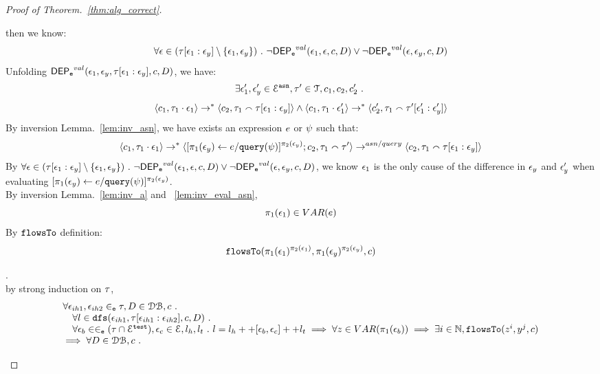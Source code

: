 \documentclass[a4paper,11pt]{article}
\begin{document}
\begin{proof}[Proof of Theorem.~\ref{thm:alg_correct}]
\begin{case}
\begin{subcase}
\begin{subsubcase}
then we know:
\[
  \forall \mathtt{\epsilon} \in (\mathtt{\tau}[\mathtt{\epsilon}_1:\mathtt{\epsilon}_y]\setminus \{\mathtt{\epsilon}_1, \mathtt{\epsilon}_y\}) ~.~
  \neg \mathsf{DEP_{\mathtt{e}}}^{val} (\mathtt{\epsilon}_1, \mathtt{\epsilon}, c, D) \lor \neg \mathsf{DEP_{\mathtt{e}}}^{val} (\mathtt{\epsilon}, \mathtt{\epsilon}_y, c, D)
\]
%
Unfolding $\mathsf{DEP_{\mathtt{e}}}^{val}(\mathtt{\epsilon}_1, \mathtt{\epsilon}_y, \mathtt{\tau}[\mathtt{\epsilon}_1:\mathtt{\epsilon}_y], c, D)$, we have:
\[
  \exists \mathtt{\epsilon}_1', \mathtt{\epsilon}_y' \in \mathcal{E}^{\mathtt{{asn}}},
  \mathtt{\tau}' \in \mathcal{T}, c_1, c_2, c_2' ~.~
\]
%
\[
\langle c_1, \mathtt{\tau}_1 \cdot \mathtt{\epsilon}_1 \rangle \rightarrow^{*} \langle c_2, \mathtt{\tau}_1 \smallfrown \mathtt{\tau}[\mathtt{\epsilon}_1:\mathtt{\epsilon}_y] \rangle 
\land
\langle c_1, \mathtt{\tau}_1 \cdot \mathtt{\epsilon}_1' \rangle \rightarrow^{*} \langle c_2', \mathtt{\tau}_1 \smallfrown \mathtt{\tau}'[\mathtt{\epsilon}_1':\mathtt{\epsilon}_y'] \rangle 
\]
%
%
By inversion Lemma.~\ref{lem:inv_asn}, we have exists an expression $e$ or $\psi$ such that:
\[
\langle c_1, \mathtt{\tau}_1 \cdot \mathtt{\epsilon}_1 \rangle \rightarrow^{*} \langle [\mathrel{ \pi_1(\mathtt{\epsilon}_y) \leftarrow e / {\tt query}(\psi) }]{}^{\pi_2(\mathtt{\epsilon}_y)};c_2, \mathtt{\tau}_1 \smallfrown \mathtt{\tau}' \rangle \rightarrow^{asn / query} \langle c_2, \mathtt{\tau}_1 \smallfrown \mathtt{\tau}[\mathtt{\epsilon}_1:\mathtt{\epsilon}_y] \rangle 
\]
%
By $\forall \mathtt{\epsilon} \in (\mathtt{\tau}[\mathtt{\epsilon}_1:\mathtt{\epsilon}_y]\setminus \{\mathtt{\epsilon}_1, \mathtt{\epsilon}_y\}) ~.~
  \neg \mathsf{DEP_{\mathtt{e}}}^{val} (\mathtt{\epsilon}_1, \mathtt{\epsilon}, c, D) \lor \neg \mathsf{DEP_{\mathtt{e}}}^{val} (\mathtt{\epsilon}, \mathtt{\epsilon}_y, c, D)$,
we know $\mathtt{\epsilon}_1$ is the only cause of the difference in $\mathtt{\epsilon}_y$ and $\mathtt{\epsilon}_y'$ when evaluating $[\mathrel{ \pi_1(\mathtt{\epsilon}_y) \leftarrow e / {\tt query}(\psi) }]{}^{\pi_2(\mathtt{\epsilon}_y)}$.
%
\\
By inversion Lemma.~\ref{lem:inv_a} and ~\ref{lem:inv_eval_asn}, 
\[
  \pi_1(\mathtt{\epsilon}_1) \in VAR(e)
\]
%
By $\mathtt{flowsTo}$ definition:
\[
  \mathtt{flowsTo}(\pi_1(\mathtt{\epsilon}_1)^{\pi_2(\mathtt{\epsilon}_1)}, \pi_1(\mathtt{\epsilon}_y)^{\pi_2(\mathtt{\epsilon}_y)}, c)
\]
%
\end{subsubcase}
%
\end{subcase}
%
\begin{subcase}.
\\
by strong induction on $\mathtt{\tau}$,
\[
\begin{array}{l}
  \forall \mathtt{\epsilon}_{ih1}, \mathtt{\epsilon}_{ih2} \in_{\mathtt{e}} \mathtt{\tau}, D \in \mathcal{DB} , c ~.~
  \\ \quad 
   \forall l \in \mathtt{dfs}(\mathtt{\epsilon}_{ih1}, \mathtt{\tau}[\mathtt{\epsilon}_{ih1}:\mathtt{\epsilon}_{ih2}], c, D) ~.~
   \\ \quad 
   \forall \mathtt{\epsilon}_b \in \in_{\mathtt{e}} (\mathtt{\tau} \cap \mathcal{E}^{\mathtt{{test}}}), \mathtt{\epsilon}_c \in \mathcal{E}, l_h, l_t ~.~ 
   l = l_h ++ [ \mathtt{\epsilon}_b, \mathtt{\epsilon}_c] ++ l_t 
   \implies \forall z \in VAR(\pi_1(\mathtt{\epsilon}_b)) \implies \exists i \in \mathbb{N}, \mathtt{flowsTo}(z^i, y^j, c)
   \\
   \implies
   \forall D \in \mathcal{DB} , c ~.~

\end{array}\]
\end{subcase}
\end{case}
\end{proof}
\end{document}
